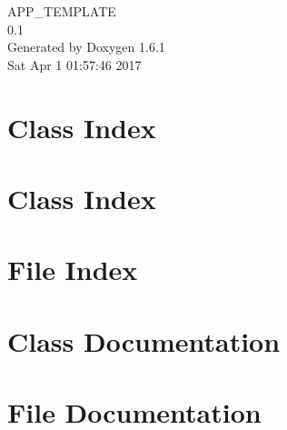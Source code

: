 \documentclass[a4paper]{book}
\begin{document}
\hypersetup{pageanchor=false}
\begin{titlepage}
\vspace*{7cm}
\begin{center}
{\Large APP\_\-TEMPLATE \\[1ex]\large 0.1 }\\
\vspace*{1cm}
{\large Generated by Doxygen 1.6.1}\\
\vspace*{0.5cm}
{\small Sat Apr 1 01:57:46 2017}\\
\end{center}
\end{titlepage}
\clearemptydoublepage
{}
\tableofcontents
\clearemptydoublepage
{}
\hypersetup{pageanchor=true}
\chapter{Class Index}

\chapter{Class Index}

\chapter{File Index}

\chapter{Class Documentation}













\chapter{File Documentation}
















\printindex
\end{document}
